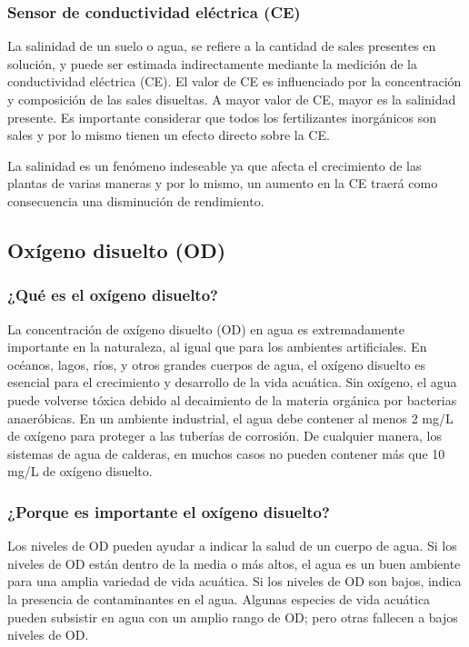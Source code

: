 \subsubsection{Sensor de conductividad eléctrica (CE) }
La salinidad de un suelo o agua, se refiere a la cantidad de sales presentes en solución, y puede ser estimada indirectamente mediante la medición de la conductividad eléctrica (CE). 
El valor de CE es influenciado por la concentración y composición de las sales disueltas. 
A mayor valor de CE, mayor es la salinidad presente. 
Es importante considerar que todos los fertilizantes inorgánicos son sales y por lo mismo tienen un efecto directo sobre la CE.

La salinidad es un fenómeno indeseable ya que afecta el crecimiento de las plantas  de varias maneras y por lo mismo, un aumento en la CE traerá como consecuencia una disminución de rendimiento.

\subsection{Oxígeno disuelto (OD)}
\subsubsection{¿Qué es el oxígeno disuelto?}
La concentración de oxígeno disuelto (OD) en agua es extremadamente importante en la naturaleza, al igual que para los ambientes artificiales.  
En océanos, lagos, ríos, y otros grandes cuerpos de agua, el oxígeno disuelto es esencial para el crecimiento y desarrollo de la vida acuática.  
Sin oxígeno, el agua puede volverse tóxica debido al decaimiento de la materia orgánica por bacterias anaeróbicas. 
En un ambiente industrial, el agua debe contener al menos 2 mg/L de oxígeno para proteger a las tuberías de corrosión.  
De cualquier manera, los sistemas de agua de calderas, en muchos casos no pueden contener más que 10 mg/L de oxígeno disuelto.

\subsubsection{¿Porque es importante el oxígeno disuelto?}
Los niveles de OD pueden ayudar a indicar la salud de un cuerpo de agua. 
Si los niveles de OD están dentro de la media o más altos, el agua es un buen ambiente para una amplia variedad de vida acuática. 
Si los niveles de OD son bajos, indica la presencia de contaminantes en el agua. 
Algunas especies de vida acuática pueden subsistir en agua con un amplio rango de OD; pero otras fallecen a bajos niveles de OD.

